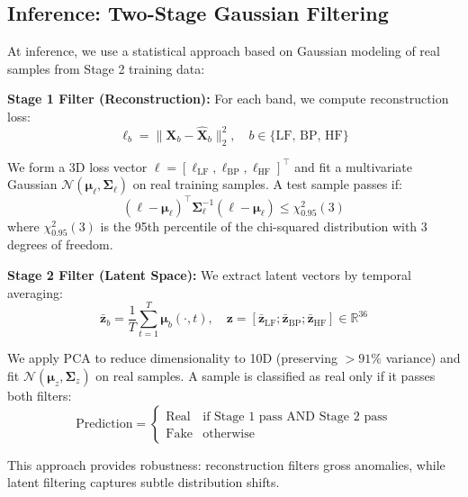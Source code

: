 \documentclass{article}
\begin{document}
\subsection{Inference: Two-Stage Gaussian Filtering}

At inference, we use a statistical approach based on Gaussian modeling of real samples from Stage 2 training data:

\textbf{Stage 1 Filter (Reconstruction):} For each band, we compute reconstruction loss:
\begin{equation}
\ell_b = \|\mathbf{X}_b - \hat{\mathbf{X}}_b\|_2^2, \quad b \in \{\text{LF, BP, HF}\}
\end{equation}

We form a 3D loss vector $\mathbf{\ell} = [\ell_{\text{LF}}, \ell_{\text{BP}}, \ell_{\text{HF}}]^\top$ and fit a multivariate Gaussian $\mathcal{N}(\boldsymbol{\mu}_\ell, \boldsymbol{\Sigma}_\ell)$ on real training samples. A test sample passes if:
\begin{equation}
(\mathbf{\ell} - \boldsymbol{\mu}_\ell)^\top \boldsymbol{\Sigma}_\ell^{-1} (\mathbf{\ell} - \boldsymbol{\mu}_\ell) \leq \chi^2_{0.95}(3)
\end{equation}
where $\chi^2_{0.95}(3)$ is the 95th percentile of the chi-squared distribution with 3 degrees of freedom.

\textbf{Stage 2 Filter (Latent Space):} We extract latent vectors by temporal averaging:
\begin{equation}
\bar{\mathbf{z}}_b = \frac{1}{T}\sum_{t=1}^T \boldsymbol{\mu}_b(\cdot, t), \quad \mathbf{z} = [\bar{\mathbf{z}}_{\text{LF}}; \bar{\mathbf{z}}_{\text{BP}}; \bar{\mathbf{z}}_{\text{HF}}] \in \mathbb{R}^{36}
\end{equation}

We apply PCA to reduce dimensionality to 10D (preserving $>91\%$ variance) and fit $\mathcal{N}(\boldsymbol{\mu}_z, \boldsymbol{\Sigma}_z)$ on real samples. A sample is classified as real only if it passes both filters:
\begin{equation}
\text{Prediction} = \begin{cases}
\text{Real} & \text{if Stage 1 pass AND Stage 2 pass} \\
\text{Fake} & \text{otherwise}
\end{cases}
\end{equation}

This approach provides robustness: reconstruction filters gross anomalies, while latent filtering captures subtle distribution shifts.
\end{document}
